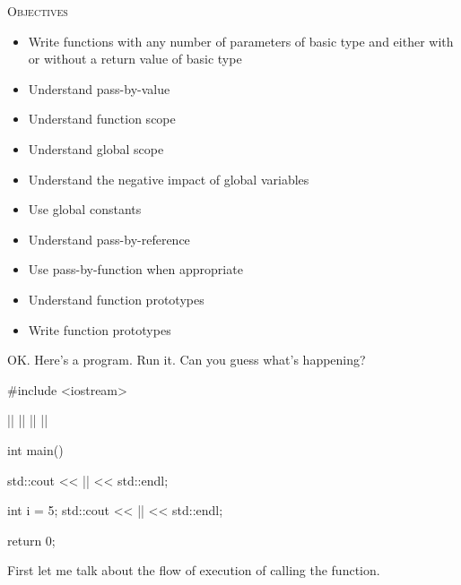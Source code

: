 \newpage{}

\textsc{Objectives}
\begin{itemize}
\item
Write functions with any number of parameters of basic type and either with or without a return value of basic type
\item
Understand pass-by-value
\item
Understand function scope
\item
Understand global scope
\item
Understand the negative impact of global variables
\item
Use global constants
\item
Understand pass-by-reference
\item
Use pass-by-function when appropriate
\item
Understand function prototypes
\item
Write function prototypes
\end{itemize}


\newpage{}

OK. Here's a program. Run it. Can you guess what's happening?
\begin{consolethree}[escapeinside=||]
#include <iostream>
         
||
|\textred{\textbf{\{}}|
    ||
|\textred{\textbf{\}}}|

int main()
{
    std::cout << || << std::endl;

    int i = 5;
    std::cout << || << std::endl;

    return 0;
}
\end{consolethree}

First let me talk about the flow of execution of calling the function.

